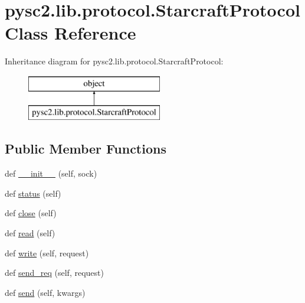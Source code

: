 \hypertarget{classpysc2_1_1lib_1_1protocol_1_1_starcraft_protocol}{}\section{pysc2.\+lib.\+protocol.\+Starcraft\+Protocol Class Reference}
\label{classpysc2_1_1lib_1_1protocol_1_1_starcraft_protocol}
Inheritance diagram for pysc2.\+lib.\+protocol.\+Starcraft\+Protocol\+:\begin{figure}[H]
\begin{center}
\leavevmode
\includegraphics[height=2.000000cm]{classpysc2_1_1lib_1_1protocol_1_1_starcraft_protocol}
\end{center}
\end{figure}
\subsection*{Public Member Functions}
\begin{DoxyCompactItemize}
\item 
def \mbox{\hyperlink{classpysc2_1_1lib_1_1protocol_1_1_starcraft_protocol_a65fca7cc64f33165f660c46142568895}{\+\_\+\+\_\+init\+\_\+\+\_\+}} (self, sock)
\item 
def \mbox{\hyperlink{classpysc2_1_1lib_1_1protocol_1_1_starcraft_protocol_a0dce2570a5feaa1da6e3d282fc2ea83a}{status}} (self)
\item 
def \mbox{\hyperlink{classpysc2_1_1lib_1_1protocol_1_1_starcraft_protocol_a0388e8e80a71a4a63a000bc52ec92653}{close}} (self)
\item 
def \mbox{\hyperlink{classpysc2_1_1lib_1_1protocol_1_1_starcraft_protocol_a7633ee8d525381b124b9c09017e2d50d}{read}} (self)
\item 
def \mbox{\hyperlink{classpysc2_1_1lib_1_1protocol_1_1_starcraft_protocol_a03ee4d6020768e77fd68d290ffa423a5}{write}} (self, request)
\item 
def \mbox{\hyperlink{classpysc2_1_1lib_1_1protocol_1_1_starcraft_protocol_a12f0a3837aad92c813ca60416dcc6a89}{send\+\_\+req}} (self, request)
\item 
def \mbox{\hyperlink{classpysc2_1_1lib_1_1protocol_1_1_starcraft_protocol_aac34f8adc8d90d432394760daa65beda}{send}} (self, kwargs)
\end{DoxyCompactItemize}


